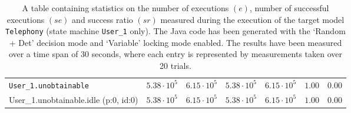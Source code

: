 \begin{table}[htbp]
{\begin{tabular}{lrrrrrr}
\\[-8pt]\texttt{User\_1.unobtainable}                 &  $5.38 \cdot 10^{5}$ &  $6.15 \cdot 10^{5}$ &  $5.38 \cdot 10^{5}$ &  $6.15 \cdot 10^{5}$ &               $1.00$ &               $0.00$ \\
\hspace{3mm}User\_1.unobtainable.idle (p:0, id:0)     &  $5.38 \cdot 10^{5}$ &  $6.15 \cdot 10^{5}$ &  $5.38 \cdot 10^{5}$ &  $6.15 \cdot 10^{5}$ &               $1.00$ &               $0.00$ \\
\bottomrule
\end{tabular}
}
\caption{A table containing statistics on the number of executions $(e)$, number of successful executions $(se)$ and success ratio $(sr)$ measured during the execution of the target model \texttt{Telephony} (state machine \texttt{User\_1} only). The Java code has been generated with the `Random + Det' decision mode and `Variable' locking mode enabled. The results have been measured over a time span of 30 seconds, where each entry is represented by measurements taken over 20 trials.}
\label{table:frequency_results_telephony_random_det_variable_user_1}
\end{table}